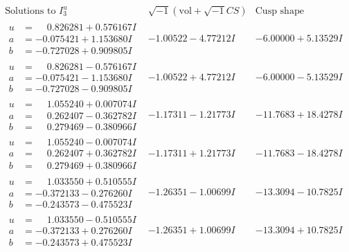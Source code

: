 \documentclass[1p]{elsarticle_modified}
\theoremstyle{definition}
\newcommand{\I}{\sqrt{-1}}
\begin{document}
$$\begin{array}{c|c|c}  
\text{Solutions to }I^u_{3}& \I (\text{vol} + \sqrt{-1}CS) & \text{Cusp shape}\\
 \hline 
\begin{aligned}
u &= \phantom{-}0.826281 + 0.576167 I \\
a &= -0.075421 + 1.153680 I \\
b &= -0.727028 + 0.909805 I\end{aligned}
 & -1.00522 - 4.77212 I & -6.00000 + 5.13529 I \\ \hline\begin{aligned}
u &= \phantom{-}0.826281 - 0.576167 I \\
a &= -0.075421 - 1.153680 I \\
b &= -0.727028 - 0.909805 I\end{aligned}
 & -1.00522 + 4.77212 I & -6.00000 - 5.13529 I \\ \hline\begin{aligned}
u &= \phantom{-}1.055240 + 0.007074 I \\
a &= \phantom{-}0.262407 - 0.362782 I \\
b &= \phantom{-}0.279469 - 0.380966 I\end{aligned}
 & -1.17311 - 1.21773 I & -11.7683 + 18.4278 I \\ \hline\begin{aligned}
u &= \phantom{-}1.055240 - 0.007074 I \\
a &= \phantom{-}0.262407 + 0.362782 I \\
b &= \phantom{-}0.279469 + 0.380966 I\end{aligned}
 & -1.17311 + 1.21773 I & -11.7683 - 18.4278 I \\ \hline\begin{aligned}
u &= \phantom{-}1.033550 + 0.510555 I \\
a &= -0.372133 - 0.276260 I \\
b &= -0.243573 - 0.475523 I\end{aligned}
 & -1.26351 - 1.00699 I & -13.3094 - 10.7825 I \\ \hline\begin{aligned}
u &= \phantom{-}1.033550 - 0.510555 I \\
a &= -0.372133 + 0.276260 I \\
b &= -0.243573 + 0.475523 I\end{aligned}
 & -1.26351 + 1.00699 I & -13.3094 + 10.7825 I \\ \hline\begin{aligned}

\end{aligned}
\end{array}$$
\end{document}
